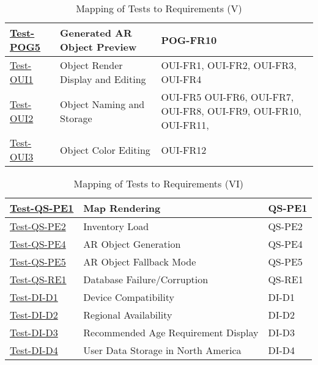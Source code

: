 \documentclass[12pt, titlepage]{article}
\begin{document}
\begin{table}[htpb!]
\begin{tabular}{|l|p{8cm}|p{3cm}|}
    \hline
    \hyperref[itm:Test-POG5]{Test-POG5} & Generated AR Object Preview                           & POG-FR10                                                        \\
    \hline
    \hyperref[itm:Test-OUI1]{Test-OUI1} & Object Render Display and Editing                     & OUI-FR1, OUI-FR2, OUI-FR3, OUI-FR4                              \\
    \hline
    \hyperref[itm:Test-OUI2]{Test-OUI2} & Object Naming and Storage                             & OUI-FR5 OUI-FR6, OUI-FR7, OUI-FR8, OUI-FR9, OUI-FR10, OUI-FR11, \\
    \hline
    \hyperref[itm:Test-OUI3]{Test-OUI3} & Object Color Editing                                  & OUI-FR12                                                        \\
    \hline
  \end{tabular}
  \caption{Mapping of Tests to Requirements (V)}
  \label{tab:test_requirements5}
\end{table}

\begin{table}[htpb!]
  \centering
  \begin{tabular}{|l|p{8cm}|p{3cm}|}
    \hline
    \hyperref[itm:Test-QS-PE1]{Test-QS-PE1} & Map Rendering                       & QS-PE1 \\
    \hline
    \hyperref[itm:Test-QS-PE2]{Test-QS-PE2} & Inventory Load                      & QS-PE2 \\
    \hline
    \hyperref[itm:Test-QS-PE4]{Test-QS-PE4} & AR Object Generation                & QS-PE4 \\
    \hline
    \hyperref[itm:Test-QS-PE5]{Test-QS-PE5} & AR Object Fallback Mode             & QS-PE5 \\
    \hline
    \hyperref[itm:Test-QS-RE1]{Test-QS-RE1} & Database Failure/Corruption         & QS-RE1 \\
    \hline
    \hyperref[itm:Test-DI-D1]{Test-DI-D1}   & Device Compatibility                & DI-D1  \\
    \hline
    \hyperref[itm:Test-DI-D2]{Test-DI-D2}   & Regional Availability               & DI-D2  \\
    \hline
    \hyperref[itm:Test-DI-D3]{Test-DI-D3}   & Recommended Age Requirement Display & DI-D3  \\
    \hline
    \hyperref[itm:Test-DI-D4]{Test-DI-D4}   & User Data Storage in North America  & DI-D4  \\
    \hline
  \end{tabular}
  \caption{Mapping of Tests to Requirements (VI)}
  \label{tab:test_requirements6}
\end{table}
\end{document}
